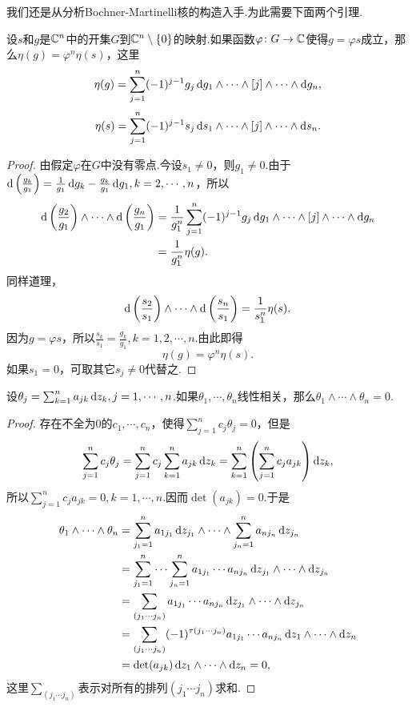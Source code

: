 我们还是从分析Bochner-Martinelli核的构造入手.为此需要下面两个引理.
\begin{lemma}\label{lem6.7.1}
	设$s$和$g$是$\mathbb C^n$中的开集$G$到$\mathbb C^n\setminus\{0\}$的映射.如果函数$\varphi\colon G\to\mathbb C$使得$g=\varphi s$成立，那么$\eta(g)=\varphi^n\eta(s)$，这里
	\[\eta(g)=\sum_{j=1}^{n}(-1)^{j-1}g_j\mathop{}\!\mathrm{d} g_1\wedge\cdots\wedge[j]\wedge\cdots\wedge\mathop{}\!\mathrm{d} g_n,\]
	\[\eta(s)=\sum_{j=1}^{n}(-1)^{j-1}s_j\mathop{}\!\mathrm{d} s_1\wedge\cdots\wedge[j]\wedge\cdots\wedge\mathop{}\!\mathrm{d} s_n.\]
\end{lemma}
\begin{proof}
	由假定$\varphi$在$G$中没有零点.今设$s_1\neq0$，则$g_1\neq0$.由于$\mathop{}\!\mathrm{d}\left(\frac{g_k}{g_1}\right)=\frac1{g_1}\mathop{}\!\mathrm{d} g_k-\frac{g_k}{g_1}\mathop{}\!\mathrm{d} g_1,k=2,\cdots,n$，所以
	\begin{align*}
		\mathop{}\!\mathrm{d}\left(\frac{g_2}{g_1}\right)\wedge\cdots\wedge\mathop{}\!\mathrm{d}\left(\frac{g_n}{g_1}\right)
		&=\frac1{g_1^n}\sum_{j=1}^{n}(-1)^{j-1}g_j\mathop{}\!\mathrm{d} g_1\wedge\cdots\wedge[j]\wedge\cdots\wedge\mathop{}\!\mathrm{d} g_n\\
		&=\frac1{g_1^n}\eta(g).
	\end{align*}
	同样道理，
	\[\mathop{}\!\mathrm{d}\left(\frac{s_2}{s_1}\right)\wedge\cdots\wedge\mathop{}\!\mathrm{d}\left(\frac{s_n}{s_1}\right)=\frac1{s_1^n}\eta(s).\]
	因为$g=\varphi s$，所以$\frac{s_k}{s_1}=\frac{g_k}{g_1},k=1,2,\cdots,n$.由此即得
	\[\eta(g)=\varphi^n \eta(s).\]
	如果$s_1=0$，可取其它$s_j\neq0$代替之.
\end{proof}
\begin{lemma}\label{lem6.7.2}
	设$\theta_j=\sum_{k=1}^{n}a_{jk}\mathop{}\!\mathrm dz_k,j=1,\cdots,n$.如果$\theta_1,\cdots,\theta_n$线性相关，那么$\theta_1\wedge\cdots\wedge\theta_n=0$.
\end{lemma}
\begin{proof}
	存在不全为$0$的$c_1,\cdots,c_n$，使得$\sum_{j=1}^{n}c_j\theta_j=0$，但是
	\[\sum_{j=1}^{n}c_j\theta_j=\sum_{j=1}^{n}c_j\sum_{k=1}^{n}a_{jk}\mathop{}\!\mathrm dz_k=\sum_{k=1}^{n}\left(\sum_{j=1}^{n}c_ja_{jk}\right)\mathop{}\!\mathrm dz_k,\]
	所以$\sum_{j=1}^{n}c_ja_{jk}=0,k=1,\cdots,n$.因而$\det(a_{jk})=0$.于是
	\begin{align*}
		\theta_1\wedge\cdots\wedge\theta_n
		&=\sum_{j_1=1}^{n}a_{1j_1}\dz_{j_1}\wedge\cdots\wedge\sum_{j_n=1}^{n}a_{nj_n}\dz_{j_n}\\
		&=\sum_{j_1=1}^{n}\cdots\sum_{j_n=1}^{n}a_{1j_1}\cdots a_{nj_n}\dz_{j_1}\wedge\cdots\wedge\dz_{j_n}\\
		&=\sum_{(j_1\cdots j_n)}a_{1j_1}\cdots a_{nj_n}\dz_{j_1}\wedge\cdots\wedge\dz_{j_n}\\
		&=\sum_{(j_1\cdots j_n)}(-1)^{\tau(j_1\cdots j_n)}a_{1j_1}\cdots a_{nj_n}\dz_{1}\wedge\cdots\wedge\dz_{n}\\
		&=\det(a_{jk})\dz_{1}\wedge\cdots\wedge\dz_{n}=0,
	\end{align*}
	这里$\sum_{(j_1\cdots j_n)}$表示对所有的排列$(j_1\cdots j_n)$求和.
\end{proof}
